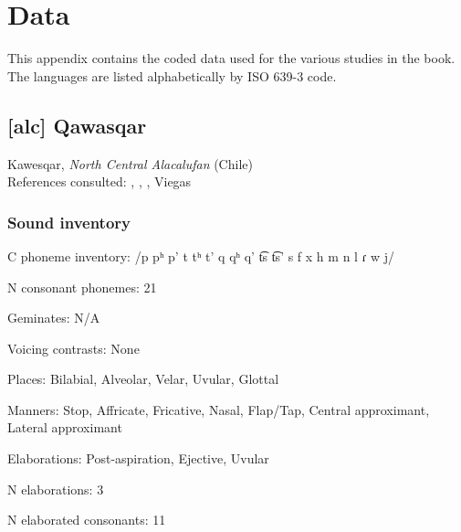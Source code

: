 \chapter{Data}
This appendix contains the coded data used for the various studies in the book. The languages are listed alphabetically by ISO 639-3 code.
{\setlength\columnsep{2cm}
\begin{multicols}{2}
\end{multicols}}

{\sloppy

\section*{[alc] Qawasqar}   %
Kawesqar, \textit{North Central Alacalufan} (Chile)\medskip\\
References consulted: \citet{Aguilera2001}, \citet{Clairis1977}, \citet{Clairis1985}, Viegas \citet{Barros1990}

\subsection*{Sound inventory}
\begin{appendixdesc}
\item[C phoneme inventory:] /p pʰ p’ t tʰ t’ q qʰ q’ t͡s t͡s’ s f x h m n l ɾ w j/

\item[N consonant phonemes:] 21
\item[Geminates:] N/A

\item[Voicing contrasts:] None

\item[Places:] Bilabial, Alveolar, Velar, Uvular, Glottal

\item[Manners:] Stop, Affricate, Fricative, Nasal, Flap/Tap, Central approximant, Lateral approximant

\item[Elaborations:] Post-aspiration, Ejective, Uvular

\item[N elaborations:] 3
\item[N elaborated consonants:] 11


\end{appendixdesc}}
